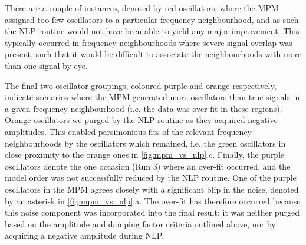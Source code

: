 There are a couple of instances, denoted by red oscillators,
where the \ac{MPM} assigned too few oscillators to a particular frequency
neighbourhood, and as such the \ac{NLP} routine would not have been able to
yield any major improvement. This typically occurred in frequency
neighbourhoods where severe signal overlap was present, such that it would be
difficult to associate the neighbourhoods with more than one signal by eye.

The final two oscillator groupings, coloured purple and orange respectively,
indicate scenarios where the \ac{MPM} generated more oscillators than true
signals in a given frequency neighbourhood (i.e. the data was over-fit in these
regions). Orange
oscillators we purged by the \ac{NLP} routine as they acquired negative
amplitudes. This enabled parsimonious fits of the relevant frequency neighbourhoods by
the oscillators which remained, i.e. the green oscillators in close proximity
to the orange ones in \cref{fig:mpm_vs_nlp}.c. Finally, the purple oscillators
denote the one
occasion (Run 3) where an over-fit occurred, and the model order was not
successfully reduced by the \ac{NLP} routine. One of the purple oscillators in
the \ac{MPM} agrees closely with a significant blip in the noise,
denoted by an asterisk in \cref{fig:mpm_vs_nlp}.a.
The over-fit has therefore occurred because this noise component was
incorporated into the final result; it was neither purged based on the
amplitude and damping factor criteria outlined above, nor by acquiring a
negative amplitude during \ac{NLP}.

